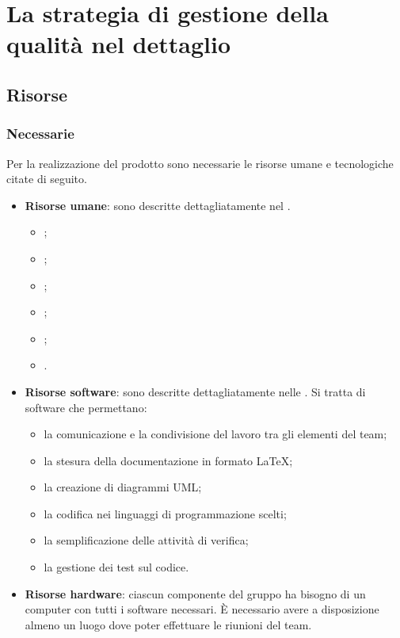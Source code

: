 \documentclass[../PianoDiQualifica.tex]{subfiles}
\begin{document}
	\section{La strategia di gestione della qualità nel dettaglio}
		\subsection{Risorse}
			\subsubsection{Necessarie}
				Per la realizzazione del prodotto sono necessarie le risorse umane e
				tecnologiche citate di seguito.
				\begin{itemize}
					\item \textbf{Risorse umane}: sono descritte dettagliatamente nel
					\pianodiprogetto. 
					\begin{itemize}
						\item \responsabilediprogetto;
						\item \amministratore;
						\item \analista;
						\item \progettista;
						\item \programmatore;
						\item \verificatore.
					\end{itemize}
					\item \textbf{Risorse software}: sono descritte dettagliatamente
					nelle \normediprogetto.
					Si tratta di software che permettano:
					\begin{itemize}
						\item la comunicazione e la condivisione del lavoro tra gli
						elementi del team;
						\item la stesura della documentazione in formato LaTeX;
						\item la creazione di diagrammi UML;
						\item la codifica nei linguaggi di programmazione scelti;
						\item la semplificazione delle attività di verifica;
						\item la gestione dei test sul codice.
					\end{itemize}
				\item \textbf{Risorse hardware}: ciascun componente del gruppo ha bisogno
				di un computer con tutti i software necessari. È necessario avere a
				disposizione almeno un luogo dove poter effettuare le riunioni del team.
				\end{itemize}
\end{document}
